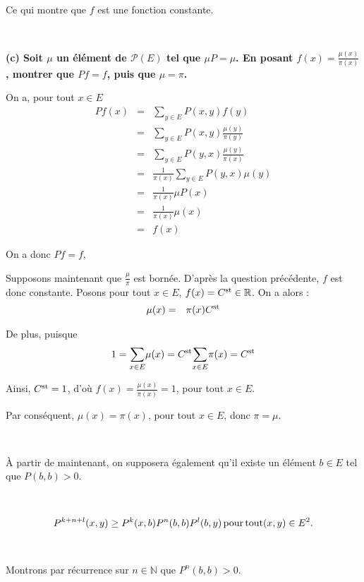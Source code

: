 Ce qui montre que $f$ est une fonction constante.

\

\textbf{(c) Soit $\mu$ un élément de $\mathcal{P}(E)$ tel que $\mu P = \mu$. En posant $f(x) = \frac{\mu(x)}{\pi(x)}$, montrer que $Pf = f$, puis que $\mu = \pi$.}

On a, pour tout $x \in E$
\begin{eqnarray*}
  P f (x) & = & \underset{y \in E}{\sum} P (x, y) f (y)\\
  & = & \underset{y \in E}{\sum} P (x, y) \frac{\mu (y)}{\pi (y)}\\
  & = & \underset{y \in E}{\sum} P (y, x) \frac{\mu (y)}{\pi (x)}\\
  & = & \frac{1}{\pi (x)} \underset{y \in E}{\sum} P (y, x) \mu (y)\\
  & = & \frac{1}{\pi (x)} \mu P (x)\\
  & = & \frac{1}{\pi (x)} \mu (x)\\
  & = & f (x)
\end{eqnarray*}


On a donc $P f = f$,

Supposons maintenant que $\frac{\mu}{\pi}$ est born{\'e}e. D'apr{\`e}s la
question pr{\'e}c{\'e}dente, $f$ est donc constante. Posons pour tout $x \in
E$, $f (x) = C^{\operatorname{st}} \in \mathbb{R}$. On a alors :
\begin{eqnarray*}
  \mu (x) & = & \pi (x) C^{\operatorname{st}}
\end{eqnarray*}


De plus, puisque
\[ 1 = \underset{x \in E}{\sum} \mu (x) = C^{\operatorname{st}} \underset{x \in
   E}{\sum} \pi (x) = C^{\operatorname{st}} \]


Ainsi, $C^{\operatorname{st}} = 1$, d'o{\`u} $f (x) = \frac{\mu (x)}{\pi (x)} = 1$,
pour tout $x \in E$.

Par cons{\'e}quent, $\mu (x) = \pi (x)$, pour tout $x \in E$, donc $\pi =
\mu$.

\

{\`A} partir de maintenant, on supposera {\'e}galement qu'il existe un
{\'e}l{\'e}ment $b \in E$ tel que $P (b, b) > 0.$

\

\[ P^{k + n + l} (x, y) \geq P^k (x, b) P^n (b, b) P^l (b, y) \operatorname{pour} \operatorname{tout} (x, y) \in E^2 . \]

\

Montrons par r{\'e}currence sur $n \in \mathbb{N}$ que $P^n (b, b) > 0$.

